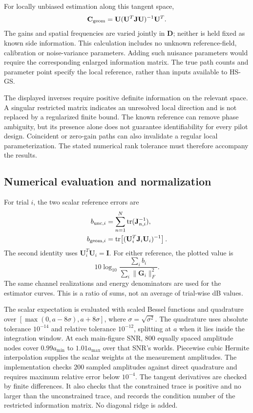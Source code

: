 \documentclass[11pt,a4paper]{article}
\begin{document}
For locally unbiased estimation along this tangent space,
\begin{equation}
\mathbf C_{\rm geom}
=\mathbf U(\mathbf U^T\mathbf J\mathbf U)^{-1}\mathbf U^T.
\end{equation}
The gains and spatial frequencies are varied jointly in $\mathbf D$;
neither is held fixed as known side information. This calculation includes
no unknown reference-field, calibration or noise-variance parameters.
Adding such nuisance parameters would require the corresponding enlarged
information matrix. The true path counts and parameter point specify the
local reference, rather than inputs available to HS-GS.

The displayed inverses require positive definite information on the
relevant space. A singular restricted matrix indicates an unresolved
local direction and is not replaced by a regularized finite bound.
The known reference can remove phase ambiguity, but its presence alone
does not guarantee identifiability for every pilot design. Coincident or
zero-gain paths can also invalidate a regular local parameterization.
The stated numerical rank tolerance must therefore accompany the results.

\subsection{Numerical evaluation and normalization}

For trial $i$, the two scalar reference errors are
\begin{align}
b_{{\rm unc},i}&=\sum_{n=1}^{N}\operatorname{tr}(\mathbf J_{n,i}^{-1}),\\
b_{{\rm geom},i}&=
 \operatorname{tr}\!\left[(\mathbf U_i^T\mathbf J_i\mathbf U_i)^{-1}\right].
\end{align}
The second identity uses $\mathbf U_i^T\mathbf U_i=\mathbf I$.
For either reference, the plotted value is
\begin{equation}
10\log_{10}
 \frac{\sum_i b_i}{\sum_i\|\mathbf G_i\|_F^2}.
\label{eq:revision-bound-normalization}
\end{equation}
The same channel realizations and energy denominators are used for the
estimator curves. This is a ratio of sums, not an average of trial-wise
dB values.

The scalar expectation is evaluated with scaled Bessel functions and
quadrature over $[\max(0,a-8\sigma),a+8\sigma]$, where
$\sigma=\sqrt{\sigma^2}$. The quadrature uses absolute tolerance
$10^{-14}$ and relative tolerance $10^{-12}$, splitting at $a$ when it
lies inside the integration window. At each main-figure SNR, 800 equally
spaced amplitude nodes cover $0.99a_{\min}$ to $1.01a_{\max}$ over that
SNR's worlds. Piecewise cubic Hermite interpolation supplies the scalar
weights at the measurement amplitudes. The implementation checks 200
sampled amplitudes against direct quadrature and requires maximum relative
error below $10^{-4}$. The tangent derivatives are checked by finite
differences. It also checks that the constrained trace is positive and
no larger than the unconstrained trace, and records the condition number
of the restricted information matrix. No diagonal ridge is added.
\end{document}
